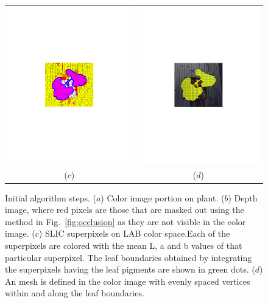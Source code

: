 \begin{figure}
\begin{center}
\begin{tabular}{cc}
\includegraphics[trim=190 280 190 290,clip,width=0.47\linewidth]{Figures/slic_cropped2} &
\includegraphics[trim=190 280 190 290,clip,width=0.47\linewidth]{Figures/beanColorMesh} \\
($c$) & ($d$) \\
\end{tabular}
\end{center}
\caption{Initial algorithm steps.  ($a$) Color image portion on plant.  ($b$) Depth image, where red pixels are those that are masked out using the method in Fig.~\ref{fig:occlusion} as they are not visible in the color image. ($c$) SLIC superpixels on LAB color space.Each of the superpixels are colored with the mean L, a and b values of that particular superpixel. The leaf boundaries obtained by integrating the superpixels having the leaf pigments are shown in green dots. ($d$) An mesh is defined in the color image with evenly spaced vertices within and along the leaf boundaries. }
\label{fig:beanimageprocess}
\end{figure}

